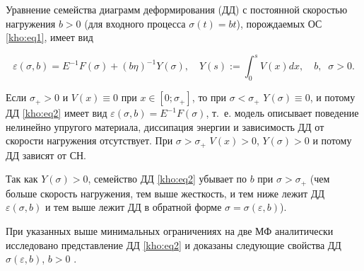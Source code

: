 
Уравнение семейства диаграмм деформирования (ДД) с постоянной скоростью нагружения $b>0$ (для входного процесса $\sigma(t)=bt$), порождаемых ОС \eqref{kho:eq1}, имеет вид

\begin{equation}

\label{kho:eq2}

\varepsilon(\sigma,b)=E^{-1}F(\sigma)+(b\eta)^{-1}Y(\sigma),

\quad

Y(s):=\int_0^s{V(x)dx} ,

\quad

b, \;  \; \sigma>0.

\end{equation}

Если $\sigma_{+}>0$ и $V(x)\equiv0$ при $x\in[0;\sigma_{+}]$, то при $\sigma<\sigma_{+}$ $Y(\sigma)\equiv0$, и потому ДД \eqref{kho:eq2} имеет вид $\varepsilon(\sigma,b)=E^{-1}F(\sigma)$, т.~е. модель описывает поведение нелинейно упругого материала, диссипация энергии и зависимость ДД от скорости нагружения отсутствует. При $\sigma>\sigma_{+}$ $V(x)>0$, $Y(\sigma)>0$ и потому ДД зависят от СН. 

Так как $Y(\sigma)>0$, семейство ДД \eqref{kho:eq2} убывает по $b$ при $\sigma>\sigma_{+}$ (чем больше скорость нагружения, тем выше жесткость, и тем ниже лежит ДД $\varepsilon(\sigma,b)$ и тем выше лежит ДД в обратной форме $\sigma=\sigma(\varepsilon,b)$). 



При указанных выше минимальных ограничениях на две МФ аналитически исследовано представление ДД \eqref{kho:eq2} и доказаны следующие свойства ДД $\sigma(\varepsilon,b)$, $b>0$ \cite{kho:bib5}. 



\smallskip



\hypertarget{kh:th1}{} 



